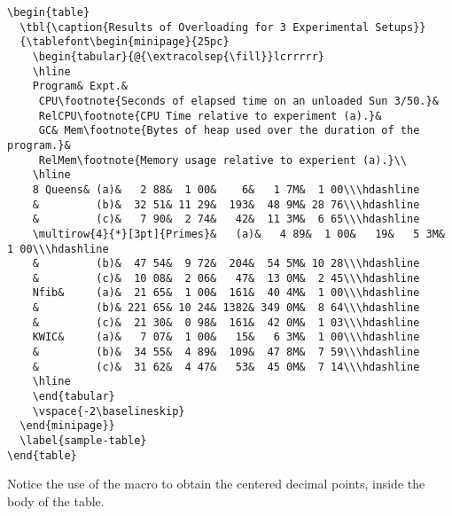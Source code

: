 \documentclass{nle}
\begin{document}
{\fontsize{7}{9}\selectfont
\begin{verbatim}
\begin{table}
  \tbl{\caption{Results of Overloading for 3 Experimental Setups}}
  {\tablefont\begin{minipage}{25pc}
    \begin{tabular}{@{\extracolsep{\fill}}lcrrrrr}
    \hline
    Program& Expt.&
     CPU\footnote{Seconds of elapsed time on an unloaded Sun 3/50.}&
     RelCPU\footnote{CPU Time relative to experiment (a).}&
     GC& Mem\footnote{Bytes of heap used over the duration of the program.}&
     RelMem\footnote{Memory usage relative to experient (a).}\\
    \hline
    8 Queens& (a)&   2 88&  1 00&    6&   1 7M&  1 00\\\hdashline
    &         (b)&  32 51& 11 29&  193&  48 9M& 28 76\\\hdashline
    &         (c)&   7 90&  2 74&   42&  11 3M&  6 65\\\hdashline
    \multirow{4}{*}[3pt]{Primes}&   (a)&   4 89&  1 00&   19&   5 3M&  1 00\\\hdashline
    &         (b)&  47 54&  9 72&  204&  54 5M& 10 28\\\hdashline
    &         (c)&  10 08&  2 06&   47&  13 0M&  2 45\\\hdashline
    Nfib&     (a)&  21 65&  1 00&  161&  40 4M&  1 00\\\hdashline
    &         (b)& 221 65& 10 24& 1382& 349 0M&  8 64\\\hdashline
    &         (c)&  21 30&  0 98&  161&  42 0M&  1 03\\\hdashline
    KWIC&     (a)&   7 07&  1 00&   15&   6 3M&  1 00\\\hdashline
    &         (b)&  34 55&  4 89&  109&  47 8M&  7 59\\\hdashline
    &         (c)&  31 62&  4 47&   53&  45 0M&  7 14\\\hdashline
    \hline
    \end{tabular}
    \vspace{-2\baselineskip}
  \end{minipage}}
  \label{sample-table}
\end{table}
\end{verbatim}}
%
\noindent Notice the use of the \verb"" macro to obtain the centered
decimal points, inside the body of the table.
\end{document}
